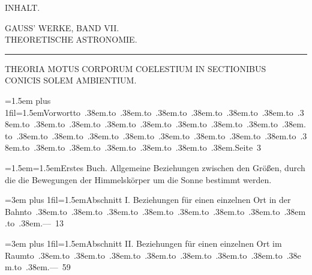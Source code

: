 \clearpage
\begingroup
{}
\renewcommand{\headrulewidth}{0pt}
\begingroup
\newcommand{\ContentsEntry}[4]{\par\begingroup\leftskip=#1\relax\rightskip=0pt plus 1fil\parfillskip=0pt\hangindent=1.5em\hangafter=1\noindent#2\nobreak\hspace{.4em}\mbox{#4}\nobreak\hspace{.5em}\hfill\mbox{#3}\par\endgroup}
\newcommand{\ContentsPoint}{\hbox to .38em{\hfil.\hfil}}
\newcommand{\ContentsText}[2]{\par\begingroup\leftskip=#1\relax\hangindent=1.5em\hangafter=1\noindent#2\par\endgroup}
\newcommand{\ContentsHeading}[1]{\needspace{4\baselineskip}\begin{center}#1\end{center}}
\newcommand{\ContentsRule}{\begin{center}\rule{.14\linewidth}{.4pt}\end{center}}
\newcommand{\ContentsJupiter}{\text{\mdseries\AstroSymbols ♃}}
\newcommand{\ContentsPallas}{\text{\mdseries\AstroSymbols ⚴}}
\ContentsHeading{{\Large INHALT.}}
\ContentsHeading{{\large GAUSS’ WERKE, BAND VII.}\\THEORETISCHE ASTRONOMIE.}
\ContentsRule
\ContentsHeading{THEORIA MOTUS CORPORUM COELESTIUM IN SECTIONIBUS\\CONICIS SOLEM AMBIENTIUM.}
\ContentsEntry{1.5em}{Vorwort}{Seite 3}{\ContentsPoint\ContentsPoint\ContentsPoint\ContentsPoint\ContentsPoint\ContentsPoint\ContentsPoint\ContentsPoint\ContentsPoint\ContentsPoint\ContentsPoint\ContentsPoint\ContentsPoint\ContentsPoint\ContentsPoint\ContentsPoint\ContentsPoint\ContentsPoint\ContentsPoint\ContentsPoint\ContentsPoint\ContentsPoint\ContentsPoint\ContentsPoint\ContentsPoint\ContentsPoint\ContentsPoint\ContentsPoint\ContentsPoint\ContentsPoint}
\ContentsText{1.5em}{Erstes Buch. Allgemeine Beziehungen zwischen den Größen, durch die die Bewegungen der Himmelskörper um die Sonne bestimmt werden.}
\ContentsEntry{3em}{Abschnitt I. Beziehungen für einen einzelnen Ort in der Bahn}{--- 13}{\ContentsPoint\ContentsPoint\ContentsPoint\ContentsPoint\ContentsPoint\ContentsPoint\ContentsPoint\ContentsPoint\ContentsPoint}
\ContentsEntry{3em}{Abschnitt II. Beziehungen für einen einzelnen Ort im Raum}{--- 59}{\ContentsPoint\ContentsPoint\ContentsPoint\ContentsPoint\ContentsPoint\ContentsPoint\ContentsPoint\ContentsPoint\ContentsPoint}
